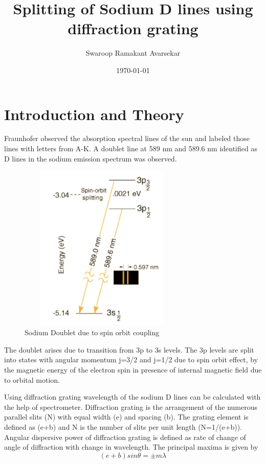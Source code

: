 \documentclass[a4paper, amsfonts, amssymb, amsmath, reprint, showkeys, nofootinbib, twoside]{revtex4-1}
\begin{document}
\title{Splitting of Sodium D lines using diffraction grating}
\author{Swaroop Ramakant Avarsekar}
\date{\today}
	
\maketitle

\section{Introduction and Theory}
Fraunhofer observed the absorption spectral lines of the sun and labeled those lines with letters from A-K. A doublet line at 589 nm and 589.6 nm identified as D lines in the sodium emission spectrum was observed. 
\begin{figure}[H] %
	\centering
	\includegraphics[width=8cm, height=8cm]{1} 
	\caption{Sodium Doublet due to spin orbit coupling}
	\label{1}
\end{figure}

The doublet arises due to transition from 3p to 3s levels. The 3p levels are split into states with angular momentum j=3/2 and j=1/2 due to spin orbit effect, by the magnetic energy of the electron spin in presence of internal magnetic field due to orbital motion.

Using diffraction grating wavelength of the sodium D lines can be calculated with the help of spectrometer. Diffraction grating is the arrangement of the numerous parallel slits (N) with equal width (e) and spacing (b). The grating element is defined as (e+b) and N is the number of slits per unit length (N=1/(e+b)). Angular dispersive power of diffraction grating is defined as rate of change of angle of  diffraction with change in wavelength. The principal maxima is given by 
\begin{equation}
	(e+b)sin \theta=\pm m \lambda
\end{equation}
\end{document}
